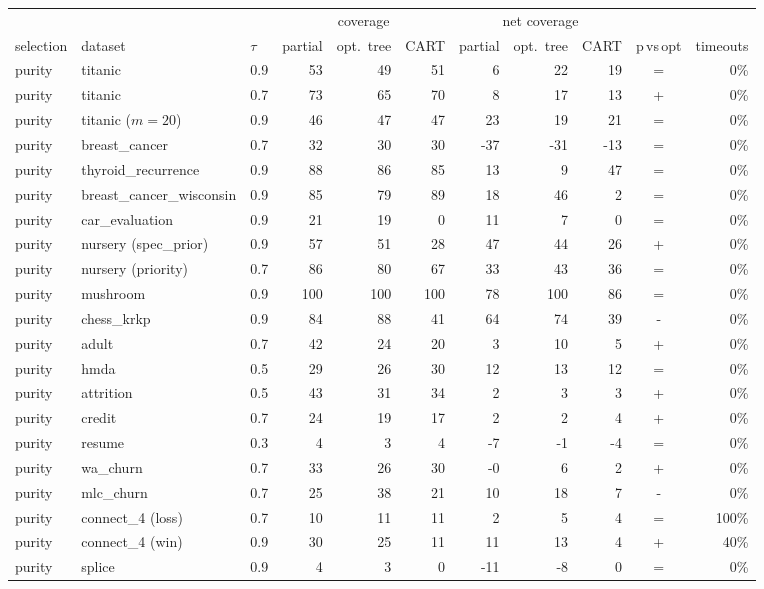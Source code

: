\begin{tabular}{lllrrrrrrcr}
\toprule
& & & \multicolumn{3}{c}{coverage} & \multicolumn{3}{c}{net coverage} & &\\
selection & dataset & $\tau$ & partial & opt.\ tree & CART & partial & opt.\ tree & CART & p$\,$vs$\,$opt & timeouts\\
\midrule
purity & titanic & 0.9 & 53 & 49 & 51 & 6 & 22 & 19 & = & 0\%\\
purity & titanic & 0.7 & 73 & 65 & 70 & 8 & 17 & 13 & + & 0\%\\
purity & titanic ($m{=}20$) & 0.9 & 46 & 47 & 47 & 23 & 19 & 21 & = & 0\%\\
purity & breast\_cancer & 0.7 & 32 & 30 & 30 & -37 & -31 & -13 & = & 0\%\\
purity & thyroid\_recurrence & 0.9 & 88 & 86 & 85 & 13 & 9 & 47 & = & 0\%\\
purity & breast\_cancer\_wisconsin & 0.9 & 85 & 79 & 89 & 18 & 46 & 2 & = & 0\%\\
purity & car\_evaluation & 0.9 & 21 & 19 & 0 & 11 & 7 & 0 & = & 0\%\\
purity & nursery (spec\_prior) & 0.9 & 57 & 51 & 28 & 47 & 44 & 26 & + & 0\%\\
purity & nursery (priority) & 0.7 & 86 & 80 & 67 & 33 & 43 & 36 & = & 0\%\\
purity & mushroom & 0.9 & 100 & 100 & 100 & 78 & 100 & 86 & = & 0\%\\
purity & chess\_krkp & 0.9 & 84 & 88 & 41 & 64 & 74 & 39 & - & 0\%\\
purity & adult & 0.7 & 42 & 24 & 20 & 3 & 10 & 5 & + & 0\%\\
purity & hmda & 0.5 & 29 & 26 & 30 & 12 & 13 & 12 & = & 0\%\\
purity & attrition & 0.5 & 43 & 31 & 34 & 2 & 3 & 3 & + & 0\%\\
purity & credit & 0.7 & 24 & 19 & 17 & 2 & 2 & 4 & + & 0\%\\
purity & resume & 0.3 & 4 & 3 & 4 & -7 & -1 & -4 & = & 0\%\\
purity & wa\_churn & 0.7 & 33 & 26 & 30 & -0 & 6 & 2 & + & 0\%\\
purity & mlc\_churn & 0.7 & 25 & 38 & 21 & 10 & 18 & 7 & - & 0\%\\
purity & connect\_4 (loss) & 0.7 & 10 & 11 & 11 & 2 & 5 & 4 & = & 100\%\\
purity & connect\_4 (win) & 0.9 & 30 & 25 & 11 & 11 & 13 & 4 & + & 40\%\\
purity & splice & 0.9 & 4 & 3 & 0 & -11 & -8 & 0 & = & 0\%\\

\end{tabular}
